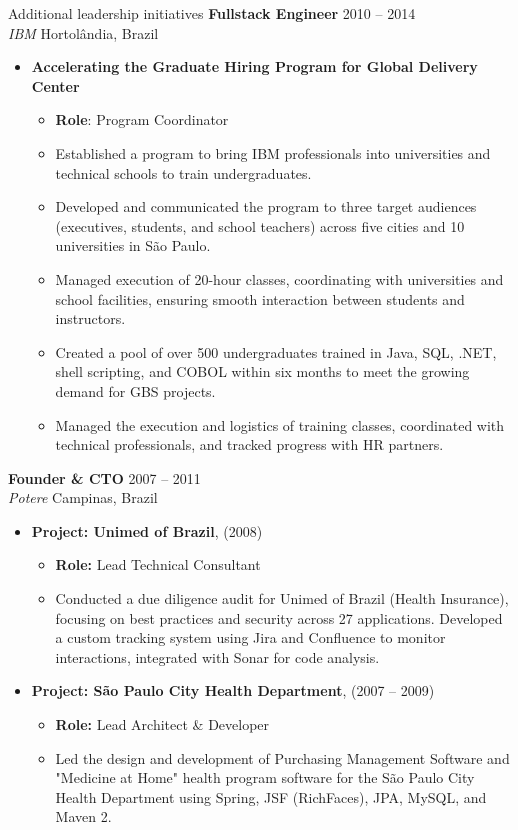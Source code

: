 \documentclass{resume} %
\begin{document}
\begin{rSection}{Additional leadership initiatives}
\hfill \break
\textbf{Fullstack Engineer} \hfill 2010 -- 2014\\
\textit{IBM} \hfill Hortolândia, Brazil\\
\begin{itemize}
    \item \textbf{Accelerating the Graduate Hiring Program for Global Delivery Center}
    \begin{itemize}
        \item \textbf{Role}: Program Coordinator
        \item Established a program to bring IBM professionals into universities and technical schools to train undergraduates.
        \item Developed and communicated the program to three target audiences (executives, students, and school teachers) across five cities and 10 universities in São Paulo.
        \item Managed execution of 20-hour classes, coordinating with universities and school facilities, ensuring smooth interaction between students and instructors.
        \item Created a pool of over 500 undergraduates trained in Java, SQL, .NET, shell scripting, and COBOL within six months to meet the growing demand for GBS projects.
        \item Managed the execution and logistics of training classes, coordinated with technical professionals, and tracked progress with HR partners.
    \end{itemize}
\end{itemize}

\textbf{Founder \& CTO} \hfill 2007 -- 2011\\
\textit{Potere} \hfill Campinas, Brazil\\
\begin{itemize}
    \item \textbf{Project: Unimed of Brazil}, \hfill (2008)
    \begin{itemize}
        \item \textbf{Role:} Lead Technical Consultant
        \item Conducted a due diligence audit for Unimed of Brazil (Health Insurance), focusing on best practices and security across 27 applications. Developed a custom tracking system using Jira and Confluence to monitor interactions, integrated with Sonar for code analysis.
    \end{itemize}

    \item \textbf{Project: São Paulo City Health Department}, \hfill (2007 -- 2009)
    \begin{itemize}
        \item \textbf{Role:} Lead Architect \& Developer
        \item Led the design and development of Purchasing Management Software and "Medicine at Home" health program software for the São Paulo City Health Department using Spring, JSF (RichFaces), JPA, MySQL, and Maven 2.
    \end{itemize}


\end{itemize}
\end{rSection}
\end{document}
